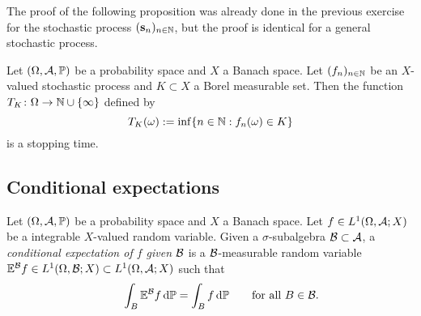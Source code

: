 The proof of the following proposition was already done in the previous exercise for the stochastic process $(\mathbf{s}_n)_{n \in \mathbb{N}}$, but the proof is identical for a general stochastic process.

\begin{prop}
  Let $(\Omega, \mathcal{A}, \mathbb{P})$ be a probability space and $X$ a Banach space.
  Let $(f_n)_{n \in \mathbb{N}}$ be an $X$-valued stochastic process and $K \subset X$ a Borel measurable set.
  Then the function $T_K \colon \Omega \rightarrow \mathbb{N} \cup \{\infty\}$ defined by
  \begin{equation*}
    T_K(\omega) := \inf\{n \in \mathbb{N} : f_n(\omega) \in K \}
  \end{equation*}
  is a stopping time.
\end{prop}

\subsection{Conditional expectations}

\begin{defn}\label{defn:conditional-expectation} %
  Let $(\Omega, \mathcal{A}, \mathbb{P})$ be a probability space and $X$ a Banach space.
  Let $f \in L^1(\Omega, \mathcal{A}; X)$ be a integrable $X$-valued random variable.
  Given a $\sigma$-subalgebra $\mathcal{B} \subset \mathcal{A}$, a \emph{conditional expectation of $f$ given $\mathcal{B}$} is a $\mathcal{B}$-measurable random variable $\mathbb{E}^{\mathcal{B}}f \in L^1(\Omega, \mathcal{B}; X) \subset L^1(\Omega,\mathcal{A};X)$ such that
  \begin{equation}\label{eq:conditional-expectation-property}
    \qquad \int_B \mathbb{E}^{\mathcal{B}}f \, \mathrm{d}\mathbb{P} = \int_B f \, \mathrm{d}\mathbb{P} \qquad \text{for all $B \in \mathcal{B}$.}
  \end{equation}
\end{defn}

